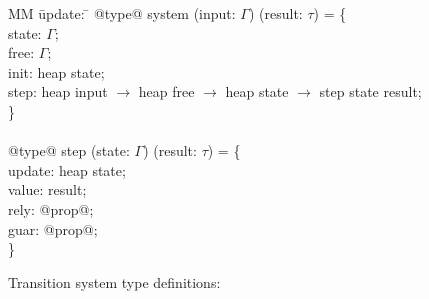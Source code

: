 
\begin{figure}
  \begin{tabbing}
  MM \= update: \= \kill
  @type@ system (input: $\Gamma$) (result: $\tau$) = \{ \\
  \> state:  \> $\Gamma$; \\
  \> free: \> $\Gamma$; \\
  \> init: \> heap state; \\
  \> step: \> heap input $\to$ heap free $\to$ heap state $\to$ step state result; \\
  \} \\
  \\
  @type@ step (state: $\Gamma$) (result: $\tau$) = \{ \\
  \> update:  \> heap state; \\
  \> value: \> result; \\
  \> rely: \> @prop@; \\
  \> guar: \> @prop@; \\
  \} \\
  \end{tabbing}
  \caption{Transition system type definitions: }
  \label{f:system-types}
\end{figure}
